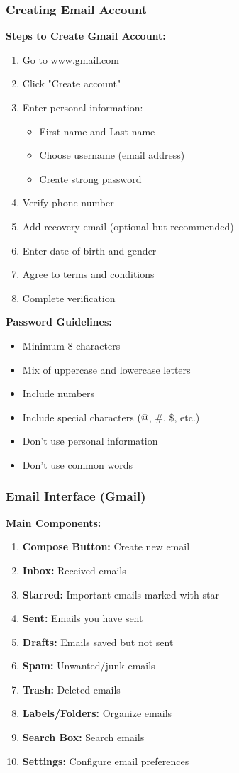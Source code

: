 \documentclass[12pt,a4paper]{article}
\begin{document}
\subsubsection{Creating Email Account}

\textbf{Steps to Create Gmail Account:}
\begin{enumerate}
    \item Go to www.gmail.com
    \item Click "Create account"
    \item Enter personal information:
    \begin{itemize}
        \item First name and Last name
        \item Choose username (email address)
        \item Create strong password
    \end{itemize}
    \item Verify phone number
    \item Add recovery email (optional but recommended)
    \item Enter date of birth and gender
    \item Agree to terms and conditions
    \item Complete verification
\end{enumerate}

\textbf{Password Guidelines:}
\begin{itemize}
    \item Minimum 8 characters
    \item Mix of uppercase and lowercase letters
    \item Include numbers
    \item Include special characters (@, \#, \$, etc.)
    \item Don't use personal information
    \item Don't use common words
\end{itemize}

\subsubsection{Email Interface (Gmail)}

\textbf{Main Components:}
\begin{enumerate}
    \item \textbf{Compose Button:} Create new email
    \item \textbf{Inbox:} Received emails
    \item \textbf{Starred:} Important emails marked with star
    \item \textbf{Sent:} Emails you have sent
    \item \textbf{Drafts:} Emails saved but not sent
    \item \textbf{Spam:} Unwanted/junk emails
    \item \textbf{Trash:} Deleted emails
    \item \textbf{Labels/Folders:} Organize emails
    \item \textbf{Search Box:} Search emails
    \item \textbf{Settings:} Configure email preferences
\end{enumerate}
\end{document}
